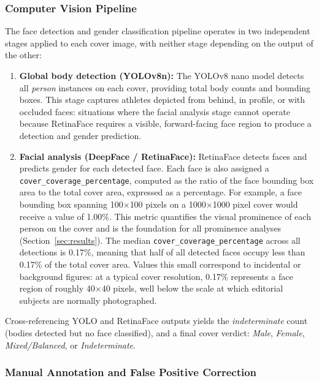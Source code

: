 \documentclass[11pt,a4paper]{article}
\begin{document}
\subsubsection{Computer Vision Pipeline}

The face detection and gender classification pipeline operates in two independent stages applied to each cover image, with neither stage depending on the output of the other:

\begin{enumerate}[itemsep=2pt]
  \item \textbf{Global body detection (YOLOv8n):} The YOLOv8 nano model detects all \textit{person} instances on each cover, providing total body counts and bounding boxes. This stage captures athletes depicted from behind, in profile, or with occluded faces: situations where the facial analysis stage cannot operate because RetinaFace requires a visible, forward-facing face region to produce a detection and gender prediction.
  \item \textbf{Facial analysis (DeepFace / RetinaFace):} RetinaFace detects faces and predicts gender for each detected face. Each face is also assigned a \texttt{cover\_coverage\_percentage}, computed as the ratio of the face bounding box area to the total cover area, expressed as a percentage. For example, a face bounding box spanning 100$\times$100 pixels on a 1000$\times$1000 pixel cover would receive a value of 1.00\%. This metric quantifies the visual prominence of each person on the cover and is the foundation for all prominence analyses (Section~\ref{sec:results}). The median \texttt{cover\_coverage\_percentage} across all detections is 0.17\%, meaning that half of all detected faces occupy less than 0.17\% of the total cover area. Values this small correspond to incidental or background figures: at a typical cover resolution, 0.17\% represents a face region of roughly 40$\times$40 pixels, well below the scale at which editorial subjects are normally photographed.
\end{enumerate}

Cross-referencing YOLO and RetinaFace outputs yields the \textit{indeterminate} count (bodies detected but no face classified), and a final cover verdict: \textit{Male}, \textit{Female}, \textit{Mixed/Balanced}, or \textit{Indeterminate}.

\subsubsection{Manual Annotation and False Positive Correction}
\label{sec:annotation}
\end{document}
